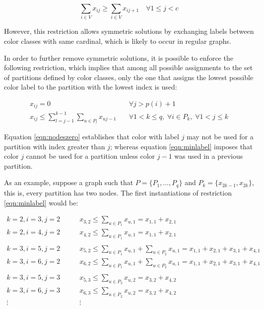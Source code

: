 \begin{equation}
\label{eqn:symnodecount}
\sum_{i \in V} x_{ij} \geq \sum_{i \in V} x_{ij+1} \quad \forall 1 \leq j < c 
\end{equation}

However, this restriction allows symmetric solutions by exchanging labels between color classes with same cardinal, which is likely to occur in regular graphs. 

In order to further remove symmetric solutions, it is possible to enforce the following restriction, which implies that among all possible assignments to the set of partitions defined by color classes, only the one that assigns the lowest possible color label to the partition with the lowest index is used: 

\begin{align}
x_{ij} = 0 \quad &\forall j > p(i) + 1 \label{eqn:nodeszero} \\
x_{ij} \leq \sum_{l = j-1}^{k-1} \sum_{u \in P_l} x_{uj-1} \quad &\forall 1 < k \leq q, \; \forall i \in P_k, \; \forall 1 < j \leq k \label{eqn:minlabel}
\end{align}

Equation \ref{eqn:nodeszero} establishes that color with label $j$ may not be used for a partition with index greater than $j$; whereas equation \ref{eqn:minlabel} imposes that color $j$ cannot be used for a partition unless color $j-1$ was used in a previous partition.

As an example, suppose a graph such that $P = \{ P_1, \ldots, P_q \}$ and $P_k = \{ x_{2k-1}, x_{2k} \}$, this is, every partition has two nodes. The first instantiations of restriction \ref{eqn:minlabel} would be:

\begin{align*}
k = 2, i = 3, j = 2 \qquad & x_{3,2} \leq \sum_{u \in P_1} x_{u,1} = x_{1,1} + x_{2,1} \\
k = 2, i = 4, j = 2 \qquad & x_{4,2} \leq \sum_{u \in P_1} x_{u,1} = x_{1,1} + x_{2,1} \\
&\\
k = 3, i = 5, j = 2 \qquad & x_{5,2} \leq \sum_{u \in P_1} x_{u,1} + \sum_{u \in P_2} x_{u,1} = x_{1,1} + x_{2,1} + x_{3,1} + x_{4,1} \\
k = 3, i = 6, j = 2 \qquad & x_{6,2} \leq \sum_{u \in P_1} x_{u,1} + \sum_{u \in P_2} x_{u,1} = x_{1,1} + x_{2,1} + x_{3,1} + x_{4,1} \\
&\\
k = 3, i = 5, j = 3 \qquad & x_{5,3} \leq \sum_{u \in P_2} x_{u,2} = x_{3,2} + x_{4,2} \\
k = 3, i = 6, j = 3 \qquad & x_{6,3} \leq \sum_{u \in P_2} x_{u,2} = x_{3,2} + x_{4,2} \\
\vdots \qquad & \vdots
\end{align*}

